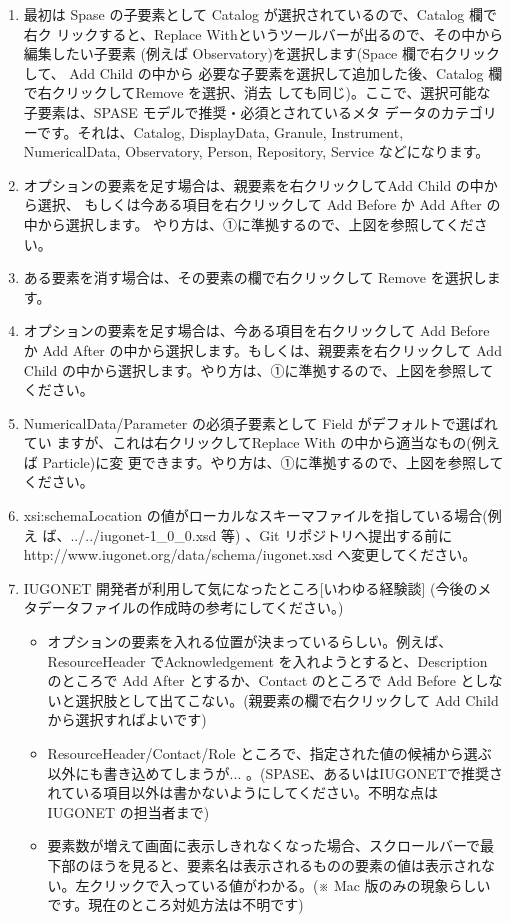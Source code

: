 \begin{enumerate}
\item 最初は Spase の子要素として Catalog が選択されているので、Catalog 欄で右ク
リックすると、\colorbox[gray]{0.8}{Replace With}というツールバーが出るので、その中から編集したい子要素
(例えば \colorbox[gray]{0.8}{Observatory})を選択します(Space 欄で右クリック して、 \colorbox[gray]{0.8}{Add Child} の中から
必要な子要素を選択して追加した後、Catalog 欄で右クリックして\colorbox[gray]{0.8}{Remove} を選択、消去
しても同じ)。ここで、選択可能な子要素は、SPASE モデルで推奨・必須とされているメタ
データのカテゴリーです。それは、Catalog, DisplayData, Granule, Instrument,
NumericalData, Observatory, Person, Repository, Service などになります。
\item オプションの要素を足す場合は、親要素を右クリックして\colorbox[gray]{0.8}{Add Child} の中から選択、
もしくは今ある項目を右クリックして \colorbox[gray]{0.8}{Add Before} か \colorbox[gray]{0.8}{Add After}
 の中から選択します。
やり方は、①に準拠するので、上図を参照してください。
\item ある要素を消す場合は、その要素の欄で右クリックして \colorbox[gray]{0.8}{Remove} を選択します。
\item オプションの要素を足す場合は、今ある項目を右クリックして \colorbox[gray]{0.8}{Add Before} か
\colorbox[gray]{0.8}{Add After} の中から選択します。もしくは、親要素を右クリックして \colorbox[gray]{0.8}{Add Child}
 の中から選択します。やり方は、①に準拠するので、上図を参照してください。
\item NumericalData/Parameter の必須子要素として Field がデフォルトで選ばれてい
ますが、これは右クリックして\colorbox[gray]{0.8}{Replace With} の中から適当なもの(例えば \colorbox[gray]{0.8}{
Particle})に変
更できます。やり方は、①に準拠するので、上図を参照してください。
\item xsi:schemaLocation の値がローカルなスキーマファイルを指している場合(例え
ば、../../iugonet-1\_0\_0.xsd 等) 、Git リポジトリへ提出する前に
http://www.iugonet.org/data/schema/iugonet.xsd へ変更してください。
\item IUGONET 開発者が利用して気になったところ[いわゆる経験談]
(今後のメタデータファイルの作成時の参考にしてください。)
\begin{itemize}
\item オプションの要素を入れる位置が決まっているらしい。例えば、ResourceHeader でAcknowledgement を入れようとすると、Description のところで \colorbox[gray]{0.8}{Add After}
 とするか、Contact のところで \colorbox[gray]{0.8}{Add Before} としないと選択肢として出てこない。(親要素の欄で右クリックして \colorbox[gray]{0.8}{Add Child} から選択すればよいです)
\item ResourceHeader/Contact/Role ところで、指定された値の候補から選ぶ以外にも書き込めてしまうが... 。(SPASE、あるいはIUGONETで推奨されている項目以外は書かないようにしてください。不明な点はIUGONET の担当者まで)
\item 要素数が増えて画面に表示しきれなくなった場合、スクロールバーで最下部のほうを見ると、要素名は表示されるものの要素の値は表示されない。左クリックで入っている値がわかる。(※ Mac 版のみの現象らしいです。現在のところ対処方法は不明です)
\end{itemize}
\end{enumerate}

